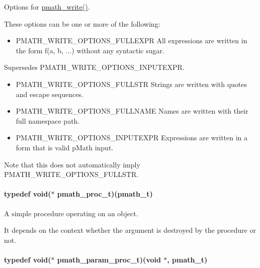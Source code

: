 Options for \hyperlink{group__objects_g9f909b9eb04317260ee8630d10e5a7c6}{pmath\_\-write()}. 

These options can be one or more of the following:\begin{itemize}
\item PMATH\_\-WRITE\_\-OPTIONS\_\-FULLEXPR All expressions are written in the form f(a, b, ...) without any syntactic sugar.\end{itemize}


Supersedes PMATH\_\-WRITE\_\-OPTIONS\_\-INPUTEXPR.

\begin{itemize}
\item PMATH\_\-WRITE\_\-OPTIONS\_\-FULLSTR Strings are written with quotes and escape sequences.\end{itemize}


\begin{itemize}
\item PMATH\_\-WRITE\_\-OPTIONS\_\-FULLNAME Names are written with their full namespace path.\end{itemize}


\begin{itemize}
\item PMATH\_\-WRITE\_\-OPTIONS\_\-INPUTEXPR Expressions are written in a form that is valid pMath input.\end{itemize}


Note that this does not automatically imply PMATH\_\-WRITE\_\-OPTIONS\_\-FULLSTR. \hypertarget{group__objects_g6c56c2d026f4cc8603a217291a8a35fb}{
\paragraph[{pmath\_\-proc\_\-t}]{\setlength{\rightskip}{0pt plus 5cm}typedef void($\ast$ {\bf pmath\_\-proc\_\-t})({\bf pmath\_\-t})}\hfill}
\label{group__objects_g6c56c2d026f4cc8603a217291a8a35fb}


A simple procedure operating on an object. 

It depends on the context whether the argument is destroyed by the procedure or not. \hypertarget{group__objects_g3ae604b25e05979c1e7ff48524636b3e}{
\paragraph[{pmath\_\-param\_\-proc\_\-t}]{\setlength{\rightskip}{0pt plus 5cm}typedef void($\ast$ {\bf pmath\_\-param\_\-proc\_\-t})(void $\ast$, {\bf pmath\_\-t})}\hfill}
\label{group__objects_g3ae604b25e05979c1e7ff48524636b3e}


